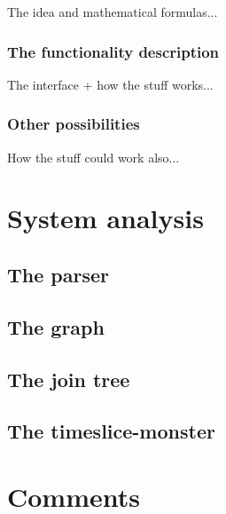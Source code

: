 \documentclass[12pt,a4paper]{report}
\begin{document}
The idea and mathematical formulas...

\subsection{The functionality description}

The interface + how the stuff works...

\subsection{Other possibilities}

How the stuff could work also...



\newpage
\chapter{System analysis}
\section{The parser}

\section{The graph}

\section{The join tree}

\section{The timeslice-monster}


\newpage
\chapter{Comments}


\newpage
%
\end{document}
